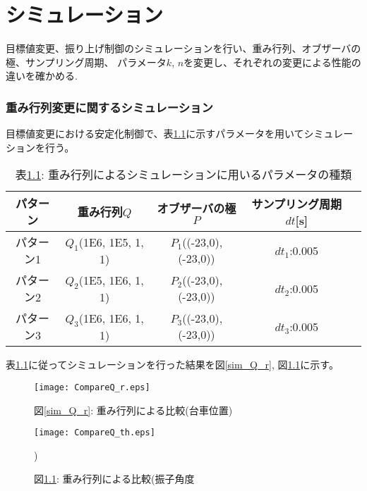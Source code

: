 \chapter{シミュレーション}
目標値変更、振り上げ制御のシミュレーションを行い、重み行列、オブザーバの極、サンプリング周期、
パラメータ$k$, $n$を変更し、それぞれの変更による性能の違いを確かめる.

\subsection{重み行列変更に関するシミュレーション}
目標値変更における安定化制御で、表\ref{sim_Q}に示すパラメータを用いてシミュレーションを行う。

\begin{table}[htbp]
    \begin{center}
        \caption{表\ref{sim_Q}: 重み行列によるシミュレーションに用いるパラメータの種類}
        \begin{tabular}{|c|c|c|c|c|} \hline
            パターン & 重み行列$Q$ & オブザーバの極$P$ & サンプリング周期$dt$[s] \\ \hline \hline
            パターン1 & $Q_1$(1E6, 1E5, 1, 1) & $P_1$((-23,0), (-23,0)) & $dt_1$:0.005 \\ \hline
            パターン2 & $Q_2$(1E5, 1E6, 1, 1) & $P_2$((-23,0), (-23,0)) & $dt_2$:0.005 \\ \hline
            パターン3 & $Q_3$(1E6, 1E6, 1, 1) & $P_3$((-23,0), (-23,0)) & $dt_3$:0.005 \\ \hline
        \end{tabular}
        \label{sim_Q}
    \end{center}
\end{table}

表\ref{sim_Q}に従ってシミュレーションを行った結果を図\ref{sim_Q_r}, 図\ref{sim_Q_th}に示す。

\begin{figure}[htbp]
    \begin{minipage}{0.5\hsize}
        \begin{center}
            \texttt{[image: CompareQ\_r.eps]}
            \caption{図\ref{sim_Q_r}: 重み行列による比較(台車位置)}
            \label{sim_Q_r}
        \end{center}
    \end{minipage}
    \begin{minipage}{0.5\hsize}
        \begin{center}
            \texttt{[image: CompareQ\_th.eps]}
            \caption{図\ref{sim_Q_th}: 重み行列による比較(振子角度})
            \label{sim_Q_th}
        \end{center}
    \end{minipage}
\end{figure}

